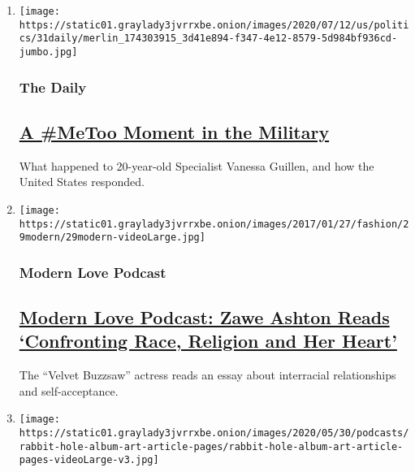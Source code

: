 \begin{enumerate}
\def\labelenumi{\arabic{enumi}.}
\item
  \texttt{[image: https://static01.graylady3jvrrxbe.onion/images/2020/07/12/us/politics/31daily/merlin\_174303915\_3d41e894-f347-4e12-8579-5d984bf936cd-jumbo.jpg]}

  \hypertarget{the-daily}{%
  \subsubsection{The Daily}\label{the-daily}}

  \hypertarget{a-metoo-moment-in-the-military}{%
  \subsection{\texorpdfstring{\href{/2020/07/31/podcasts/the-daily/vanessa-guillen-military-metoo.html}{A
  \#MeToo Moment in the
  Military}}{A \#MeToo Moment in the Military}}\label{a-metoo-moment-in-the-military}}

  What happened to 20-year-old Specialist Vanessa Guillen, and how the
  United States responded.
\item
  \texttt{[image: https://static01.graylady3jvrrxbe.onion/images/2017/01/27/fashion/29modern/29modern-videoLarge.jpg]}

  \hypertarget{modern-love-podcast}{%
  \subsubsection{Modern Love Podcast}\label{modern-love-podcast}}

  \hypertarget{modern-love-podcast-zawe-ashton-reads-confronting-race-religion-and-her-heart}{%
  \subsection{\texorpdfstring{\href{/2020/06/24/style/modern-love-podcast-zawe-ashton.html}{Modern
  Love Podcast: Zawe Ashton Reads `Confronting Race, Religion and Her
  Heart'}}{Modern Love Podcast: Zawe Ashton Reads `Confronting Race, Religion and Her Heart'}}\label{modern-love-podcast-zawe-ashton-reads-confronting-race-religion-and-her-heart}}

  The ``Velvet Buzzsaw'' actress reads an essay about interracial
  relationships and self-acceptance.
\item
  \texttt{[image: https://static01.graylady3jvrrxbe.onion/images/2020/05/30/podcasts/rabbit-hole-album-art-article-pages/rabbit-hole-album-art-article-pages-videoLarge-v3.jpg]}


\end{enumerate}

